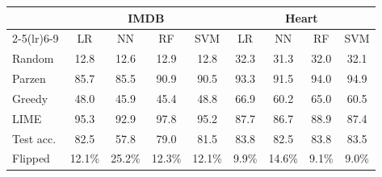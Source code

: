 \begin{tabular}{lcccccccc}
\toprule
 & \multicolumn{4}{c}{IMDB} & \multicolumn{4}{c}{Heart} \\
\cmidrule(lr){2-5}\cmidrule(lr){6-9}
 & LR & NN & RF & SVM & LR & NN & RF & SVM \\
\midrule
Random & 12.8 & 12.6 & 12.9 & 12.8 & 32.3 & 31.3 & 32.0 & 32.1 \\
Parzen & 85.7 & 85.5 & 90.9 & 90.5 & 93.3 & 91.5 & 94.0 & 94.9 \\
Greedy & 48.0 & 45.9 & 45.4 & 48.8 & 66.9 & 60.2 & 65.0 & 60.5 \\
LIME & 95.3 & 92.9 & 97.8 & 95.2 & 87.7 & 86.7 & 88.9 & 87.4 \\
\midrule
Test acc. & 82.5 & 57.8 & 79.0 & 81.5 & 83.8 & 82.5 & 83.8 & 83.5 \\
Flipped & 12.1\% & 25.2\% & 12.3\% & 12.1\% & 9.9\% & 14.6\% & 9.1\% & 9.0\% \\
\bottomrule
\end{tabular}
